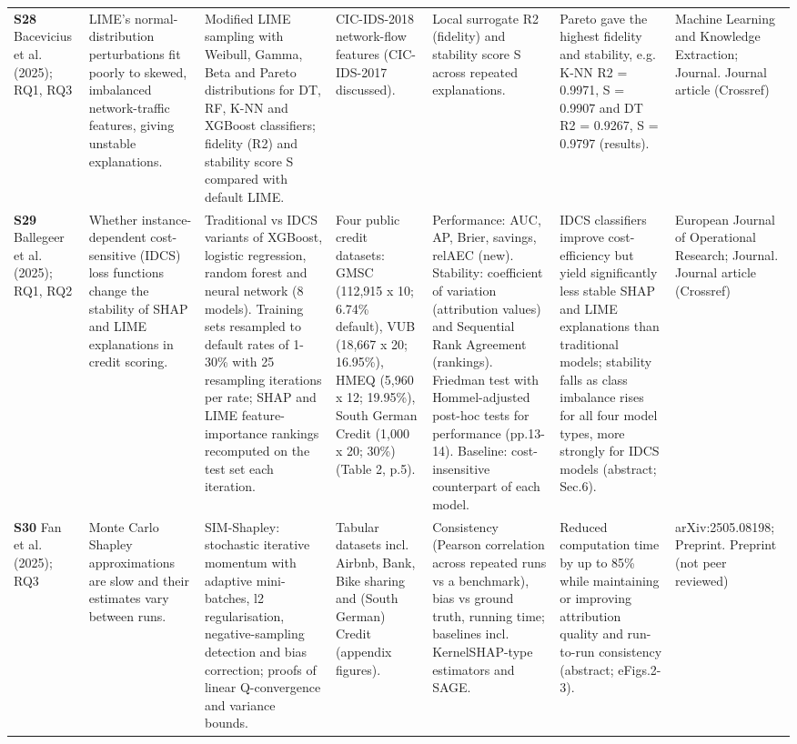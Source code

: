 \begin{longtable}{@{}P{1.55cm}P{2.9cm}P{4.5cm}P{3.2cm}P{3.4cm}P{4.6cm}P{3.6cm}@{}}
\textbf{S28} \cite{S28} Bacevicius et al. (2025); RQ1, RQ3 & LIME's normal-distribution perturbations fit poorly to skewed, imbalanced network-traffic features, giving unstable explanations. & Modified LIME sampling with Weibull, Gamma, Beta and Pareto distributions for DT, RF, K-NN and XGBoost classifiers; fidelity (R2) and stability score S compared with default LIME. & CIC-IDS-2018 network-flow features (CIC-IDS-2017 discussed). & Local surrogate R2 (fidelity) and stability score S across repeated explanations. & Pareto gave the highest fidelity and stability, e.g. K-NN R2 = 0.9971, S = 0.9907 and DT R2 = 0.9267, S = 0.9797 (results). & Machine Learning and Knowledge Extraction; Journal. Journal article (Crossref) \\
\textbf{S29} \cite{S29} Ballegeer et al. (2025); RQ1, RQ2 & Whether instance-dependent cost-sensitive (IDCS) loss functions change the stability of SHAP and LIME explanations in credit scoring. & Traditional vs IDCS variants of XGBoost, logistic regression, random forest and neural network (8 models). Training sets resampled to default rates of 1-30\% with 25 resampling iterations per rate; SHAP and LIME feature-importance rankings recomputed on the test set each iteration. & Four public credit datasets: GMSC (112,915 x 10; 6.74\% default), VUB (18,667 x 20; 16.95\%), HMEQ (5,960 x 12; 19.95\%), South German Credit (1,000 x 20; 30\%) (Table 2, p.5). & Performance: AUC, AP, Brier, savings, relAEC (new). Stability: coefficient of variation (attribution values) and Sequential Rank Agreement (rankings). Friedman test with Hommel-adjusted post-hoc tests for performance (pp.13-14). Baseline: cost-insensitive counterpart of each model. & IDCS classifiers improve cost-efficiency but yield significantly less stable SHAP and LIME explanations than traditional models; stability falls as class imbalance rises for all four model types, more strongly for IDCS models (abstract; Sec.6). & European Journal of Operational Research; Journal. Journal article (Crossref) \\
\textbf{S30} \cite{S30} Fan et al. (2025); RQ3 & Monte Carlo Shapley approximations are slow and their estimates vary between runs. & SIM-Shapley: stochastic iterative momentum with adaptive mini-batches, l2 regularisation, negative-sampling detection and bias correction; proofs of linear Q-convergence and variance bounds. & Tabular datasets incl. Airbnb, Bank, Bike sharing and (South German) Credit (appendix figures). & Consistency (Pearson correlation across repeated runs vs a benchmark), bias vs ground truth, running time; baselines incl. KernelSHAP-type estimators and SAGE. & Reduced computation time by up to 85\% while maintaining or improving attribution quality and run-to-run consistency (abstract; eFigs.2-3). & arXiv:2505.08198; Preprint. Preprint (not peer reviewed) \\

\end{longtable}

